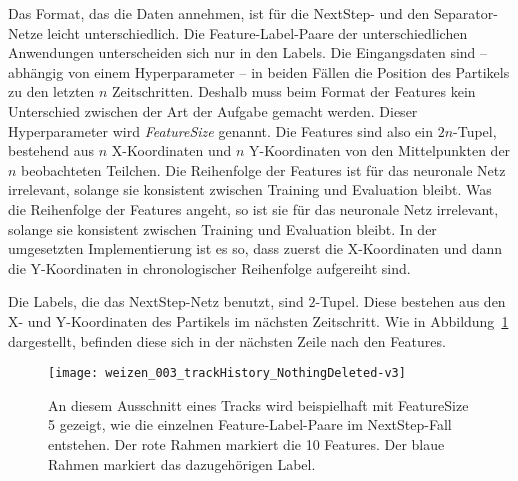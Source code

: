 Das Format, das die Daten annehmen, ist für die NextStep- und den Separator-Netze leicht unterschiedlich.
Die Feature-Label-Paare der unterschiedlichen Anwendungen unterscheiden sich nur in den Labels.
Die Eingangsdaten sind -- abhängig von einem Hyperparameter --
in beiden Fällen die Position des Partikels zu den letzten \(n\) Zeitschritten.
Deshalb muss beim Format der Features kein Unterschied zwischen der Art der Aufgabe gemacht werden.
Dieser Hyperparameter wird \textit{FeatureSize} genannt. 
Die Features sind also ein \(2n\)-Tupel, bestehend aus \(n\) X-Koordinaten und \(n\) Y-Koordinaten 
von den Mittelpunkten der \(n\) beobachteten Teilchen.
Die Reihenfolge der Features ist für das neuronale Netz irrelevant, solange sie konsistent zwischen Training und Evaluation bleibt.
Was die Reihenfolge der Features angeht, so ist sie für das neuronale Netz irrelevant, 
solange sie konsistent zwischen Training und Evaluation bleibt. 
In der umgesetzten Implementierung ist es so, dass zuerst die X-Koordinaten 
und dann die Y-Koordinaten in chronologischer Reihenfolge aufgereiht sind. 



Die Labels, die das NextStep-Netz benutzt, sind \(2\)-Tupel.
Diese bestehen aus den X- und Y-Koordinaten des Partikels im nächsten Zeitschritt.
Wie in Abbildung~\ref{fig:FLPNext} dargestellt, befinden diese sich in der nächsten Zeile nach den Features.

\begin{figure}
	\centering
	\texttt{[image: weizen\_003\_trackHistory\_NothingDeleted-v3]}
	\caption[Beispiel Feature-Label-Paar NextStep]{An diesem Ausschnitt eines Tracks wird beispielhaft mit FeatureSize 5 gezeigt, wie die einzelnen Feature-Label-Paare im NextStep-Fall entstehen.
		Der rote Rahmen markiert die 10 Features. Der blaue Rahmen markiert das dazugehörigen Label. 
		}
	\label{fig:FLPNext}
\end{figure}


